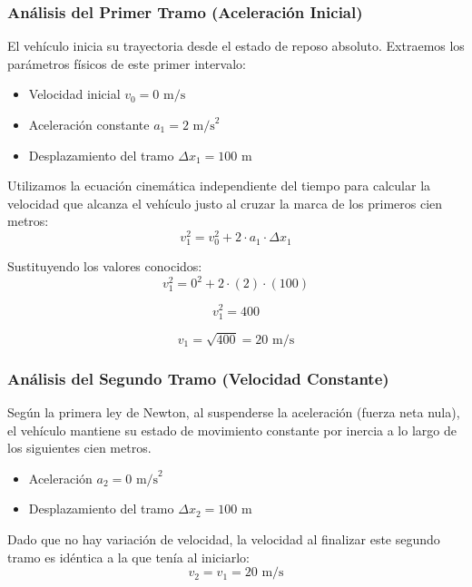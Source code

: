 \documentclass[12pt, a4paper]{article}
\begin{document}
\subsubsection*{Análisis del Primer Tramo (Aceleración Inicial)}

El vehículo inicia su trayectoria desde el estado de reposo absoluto. Extraemos los parámetros físicos de este primer intervalo:
\begin{itemize}
    \item Velocidad inicial $v_0 = 0 \text{ m/s}$
    \item Aceleración constante $a_1 = 2 \text{ m/s}^2$
    \item Desplazamiento del tramo $\Delta x_1 = 100 \text{ m}$
\end{itemize}

Utilizamos la ecuación cinemática independiente del tiempo para calcular la velocidad que alcanza el vehículo justo al cruzar la marca de los primeros cien metros:
\begin{equation}
v_1^2 = v_0^2 + 2 \cdot a_1 \cdot \Delta x_1
\end{equation}

Sustituyendo los valores conocidos:
\begin{equation}
v_1^2 = 0^2 + 2 \cdot (2) \cdot (100)
\end{equation}

\begin{equation}
v_1^2 = 400
\end{equation}

\begin{equation}
v_1 = \sqrt{400} = 20 \text{ m/s}
\end{equation}

\subsubsection*{Análisis del Segundo Tramo (Velocidad Constante)}

Según la primera ley de Newton, al suspenderse la aceleración (fuerza neta nula), el vehículo mantiene su estado de movimiento constante por inercia a lo largo de los siguientes cien metros.
\begin{itemize}
    \item Aceleración $a_2 = 0 \text{ m/s}^2$
    \item Desplazamiento del tramo $\Delta x_2 = 100 \text{ m}$
\end{itemize}

Dado que no hay variación de velocidad, la velocidad al finalizar este segundo tramo es idéntica a la que tenía al iniciarlo:
\begin{equation}
v_2 = v_1 = 20 \text{ m/s}
\end{equation}
\end{document}
